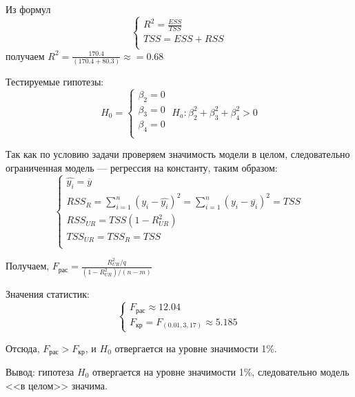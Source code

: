 \documentclass[pdftex,11pt,openany]{book}\usepackage[]{graphicx}\usepackage[]{color}
\begin{document}
\begin{solution}
Из формул
\[
\begin{cases}
R^2=\frac{ESS}{TSS}\\
TSS=ESS+RSS\\
\end{cases}
\]
получаем $R^2=\frac{170.4}{(170.4+80.3)}\approx=0.68$

Тестируемые гипотезы:
\[
H_0=
\begin{cases}
\beta_2=0\\
\beta_3=0\\
\beta_4=0\\
\end{cases}
\;
H_a:\beta_2^2+\beta_3^2+\beta_4^2>0 
\]

Так как по условию задачи проверяем значимость модели в целом, следовательно ограниченная модель --- регрессия на константу, таким образом:
\[
\begin{cases}
\widehat{y_i}=\overline{y}\\
RSS_{R}=\sum_{i=1}^{n}(y_i-\widehat{y_i})^2=\sum_{i=1}^{n}(y_i-\overline{y_i})^2=TSS\\
RSS_{UR}=TSS(1-R^2_{UR})\\
TSS_{UR}=TSS_{R}=TSS\\
\end{cases}
\]

Получаем, $F_{\text{рас}}=\frac{R_{UR}^2/q}{(1-R^2_{UR})/(n-m)}$

Значения статистик:
\[
\begin{cases}
F_{\text{рас}}\approx 12.04\\
F_{\text{кр}}=F_(0.01,3,17)\approx 5.185
\end{cases}
\]

Отсюда, 
$F_{\text{рас}}>F_{\text{кр}}$, и  $H_0$ отвергается на уровне значимости 1\%.

Вывод: гипотеза $H_0$ отвергается на уровне значимости 1\%, 
следовательно модель <<в целом>> значима.
\end{solution}
\end{document}
